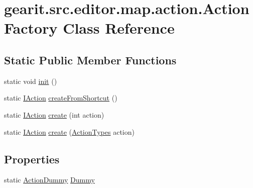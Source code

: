 \hypertarget{classgearit_1_1src_1_1editor_1_1map_1_1action_1_1_action_factory}{\section{gearit.\+src.\+editor.\+map.\+action.\+Action\+Factory Class Reference}
\label{classgearit_1_1src_1_1editor_1_1map_1_1action_1_1_action_factory}
}
\subsection*{Static Public Member Functions}
\begin{DoxyCompactItemize}
\item 
static void \hyperlink{classgearit_1_1src_1_1editor_1_1map_1_1action_1_1_action_factory_abac8f9c26ac6f361547540d7984caf36}{init} ()
\item 
static \hyperlink{interfacegearit_1_1src_1_1editor_1_1map_1_1action_1_1_i_action}{I\+Action} \hyperlink{classgearit_1_1src_1_1editor_1_1map_1_1action_1_1_action_factory_a5d21d43666d0acc83d22bfe8eb82a33b}{create\+From\+Shortcut} ()
\item 
static \hyperlink{interfacegearit_1_1src_1_1editor_1_1map_1_1action_1_1_i_action}{I\+Action} \hyperlink{classgearit_1_1src_1_1editor_1_1map_1_1action_1_1_action_factory_adb2f9b824b19ecc6c45ddc4774c623a1}{create} (int action)
\item 
static \hyperlink{interfacegearit_1_1src_1_1editor_1_1map_1_1action_1_1_i_action}{I\+Action} \hyperlink{classgearit_1_1src_1_1editor_1_1map_1_1action_1_1_action_factory_a01a1faa7651959667beb41aa6c268cb0}{create} (\hyperlink{namespacegearit_1_1src_1_1editor_1_1map_1_1action_af036712a7d960b13d1e31954e65c00e3}{Action\+Types} action)
\end{DoxyCompactItemize}
\subsection*{Properties}
\begin{DoxyCompactItemize}
\item 
static \hyperlink{classgearit_1_1src_1_1editor_1_1map_1_1action_1_1_action_dummy}{Action\+Dummy} \hyperlink{classgearit_1_1src_1_1editor_1_1map_1_1action_1_1_action_factory_a637f9009deb510ac36b28e55002622ce}{Dummy}
\end{DoxyCompactItemize}


